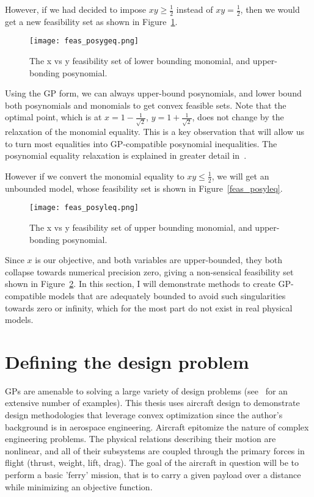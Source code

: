 However, if we had decided to impose $xy \geq \frac{1}{2}$ instead of $xy = \frac{1}{2}$,
then we would get a new feasibility set as shown in Figure~\ref{f:feas_posygeq}.

\begin{figure}
    \centering
    \texttt{[image: feas\_posygeq.png]}
    \caption{The x vs y feasibility set of lower bounding monomial,
    and upper-bonding posynomial.}
    \label{f:feas_posygeq}
\end{figure}

Using the \gls{GP} form, we can always upper-bound posynomials, and lower bound both posynomials
and monomials to get convex feasible sets. Note that the optimal point, which is at
$x = 1 - \frac{1}{\sqrt{2}}$, $y = 1 + \frac{1}{\sqrt{2}}$,
does not change by the relaxation of the monomial equality. This is a key
observation that will allow us to turn most equalities into \gls{GP}-compatible
posynomial inequalities. The posynomial equality relaxation is explained in greater detail
in~\cite{hoburg_thesis}.

However if we convert the monomial equality to  $xy \leq \frac{1}{2}$, we will get an unbounded model,
whose feasibility set is shown in Figure~\ref{feas_posyleq}.

\begin{figure}
    \centering
    \texttt{[image: feas\_posyleq.png]}
    \caption{The x vs y feasibility set of upper bounding monomial,
    and upper-bonding posynomial.}
    \label{f:feas_posyleq}
\end{figure}

Since $x$ is our objective, and both variables are upper-bounded, they both collapse towards numerical
precision zero,
giving a non-sensical feasibility set shown in Figure~\ref{f:feas_posyleq}. In this section, I will
demonstrate methods to create \gls{GP}-compatible models that are adequately bounded to avoid such
singularities towards zero or infinity, which for the most part do not
exist in real physical models.

\section{Defining the design problem}

\gls{GP}s are amenable to solving a large variety of design problems (see~\cite{gpintro} for an
extensive number of examples). This thesis uses aircraft design to demonstrate
design methodologies that leverage convex optimization since the author's background is in aerospace engineering.
Aircraft epitomize the nature of complex engineering problems. The physical 
relations describing their motion are nonlinear, and all of their subsystems are 
coupled through the primary forces in flight (thrust, weight, lift, drag).
The goal of the aircraft in question will be to perform a basic 'ferry' mission, that
is to carry a given payload
over a distance while minimizing an objective function.

